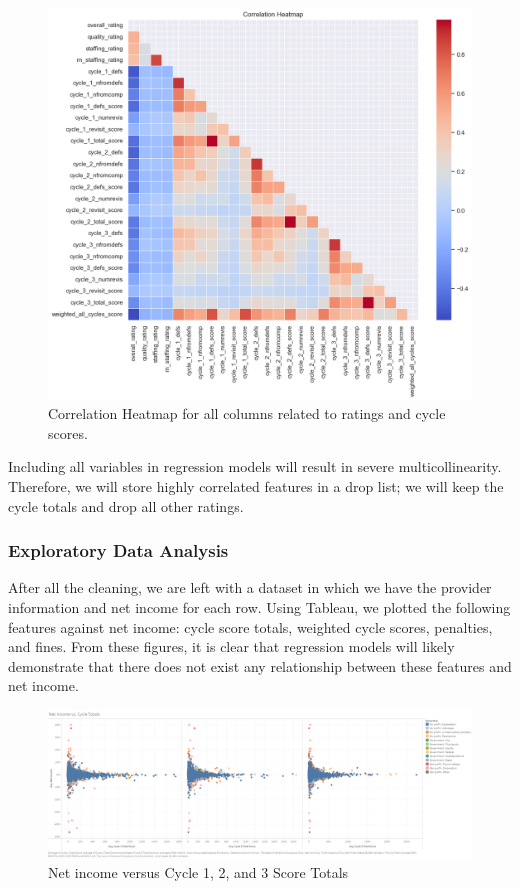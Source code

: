 \documentclass{article}
\theoremstyle{mytheoremstyle}
\theoremstyle{mytheoremstyle}
\theoremstyle{myproblemstyle}
\begin{document}
\pagebreak
\begin{figure}[htbp]
\centering
\includegraphics[width=0.8\linewidth]{Images/multicolinheat.png}
\caption{Correlation Heatmap for all columns related to ratings and cycle scores.}
\label{fig:Correl Heatmap}
\end{figure}

Including all variables in regression models will result in severe multicollinearity. Therefore, we will store highly correlated features in a drop list; we will keep the cycle totals and drop all other ratings.

\subsubsection{Exploratory Data Analysis}
After all the cleaning, we are left with a dataset in which we have the provider information and net income for each row. Using Tableau, we plotted the following features against net income: cycle score totals, weighted cycle scores, penalties, and fines. From these figures, it is clear that regression models will likely demonstrate that there does not exist any relationship between these features and net income.



\begin{figure}[htbp]
\centering
\includegraphics[width=\linewidth]{Images/Net Income vs. Cycle Totals.png}
\caption{Net income versus Cycle 1, 2, and 3 Score Totals}
\label{fig:net income vs cycle totals}
\end{figure}
\end{document}
